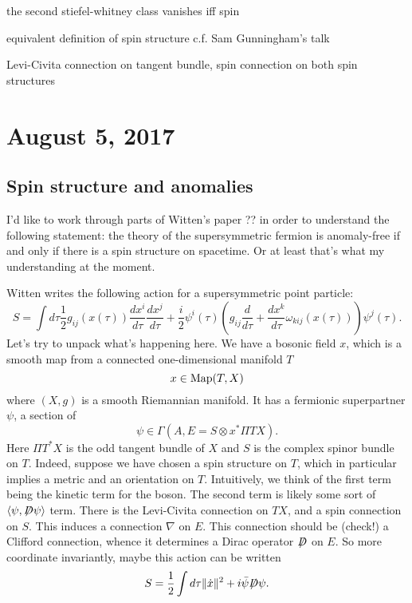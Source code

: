 \documentclass{amsart}
\newcommand{\fsl}[1]{{\centernot{#1}}}
\begin{document}
\begin{theorem}
    the second stiefel-whitney class vanishes iff spin
\end{theorem}

equivalent definition of spin structure c.f. Sam Gunningham's talk

Levi-Civita connection on tangent bundle, spin connection on both spin structures

\section{August 5, 2017}

\subsection{Spin structure and anomalies}

I'd like to work through parts of Witten's paper ?? in order to understand the following
statement: the theory of the supersymmetric fermion is anomaly-free if and only if there
is a spin structure on spacetime. Or at least that's what my understanding at the moment.

Witten writes the following action for a supersymmetric point particle:
\begin{equation*}
    S = \int d\tau \frac{1}{2}g_{ij}(x(\tau))\frac{dx^i}{d\tau}\frac{dx^j}{d\tau}
    + \frac{i}{2}\psi^i(\tau)\left( g_{ij}\frac{d}{d\tau}+\frac{dx^k}{d\tau}\omega_{kij}(x(\tau)) \right)\psi^j(\tau).
\end{equation*}
Let's try to unpack what's happening here. We have a bosonic field $x$, which is a smooth
map from a connected one-dimensional manifold $T$
\begin{equation*}
    x\in \operatorname*{Map}(T, X)
\end{equation*}
where $(X,g)$ is a smooth Riemannian manifold. It has a fermionic superpartner $\psi$,
a section of
\begin{equation*}
    \psi \in \Gamma(A, E=S\otimes x^*\Pi TX).
\end{equation*}
Here $\Pi T^*X$ is the odd tangent bundle of $X$ and $S$ is the complex spinor bundle on
$T$. Indeed, suppose we have chosen a spin structure on $T$, which in particular implies
a metric and an orientation on $T$. Intuitively, we think of the first term being the
kinetic term for the boson. The second term is likely some sort of
$\langle\psi,\fsl D\psi\rangle$ term. There is the Levi-Civita connection on $TX$,
and a spin connection on $S$. This induces a connection $\nabla$ on $E$.
This connection should be (check!) a Clifford connection, whence it determines a
Dirac operator $\fsl D$ on $E$. So more coordinate invariantly, maybe this action can
be written
\begin{equation*}
    S = \frac{1}{2}\int d\tau \lVert \dot x\rVert^2 + i\bar \psi\fsl D\psi.
\end{equation*}
\end{document}
